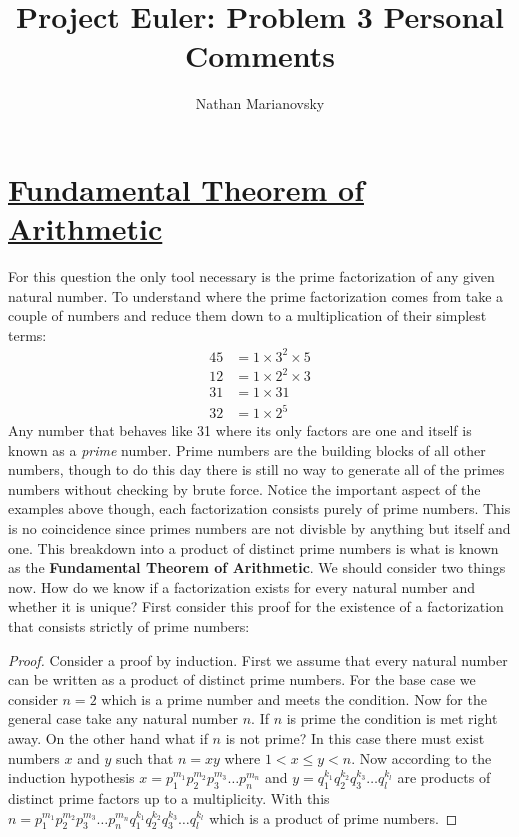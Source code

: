 \documentclass[12pt, letterpaper, onecolumn, conference, final]{IEEEtran}
\title{Project Euler: Problem 3 Personal Comments}
\author{Nathan Marianovsky}
\theoremstyle{definition}
\theoremstyle{plain}
\begin{document}
\maketitle

\section*{\underline{\Large{Fundamental Theorem of Arithmetic}}}
\vspace{.3cm}
\noindent
For this question the only tool necessary is the prime factorization of any given natural number. To understand where the prime factorization comes from take a couple of numbers and reduce them down to a multiplication of their simplest terms:
\begin{equation*}
\begin{split}
45 &= 1 \times 3^2 \times 5 \\
12 &= 1 \times 2^2 \times 3 \\
31 &= 1 \times 31 \\
32 &= 1 \times 2^5
\end{split}
\end{equation*}
Any number that behaves like 31 where its only factors are one and itself is known as a \textit{prime} number. Prime numbers are the building blocks of all other numbers, though to do this day there is still no way to generate all of the primes numbers without checking by brute force. Notice the important aspect of the examples above though, each factorization consists purely of prime numbers. This is no coincidence since primes numbers are not divisble by anything but itself and one. This breakdown into a product of distinct prime numbers is what is known as the \textbf{Fundamental Theorem of Arithmetic}. We should consider two things now. How do we know if a factorization exists for every natural number and whether it is unique? First consider this proof for the existence of a factorization that consists strictly of prime numbers:
\begin{proof}
Consider a proof by induction. First we assume that every natural number can be written as a product of distinct prime numbers. For the base case we consider $n=2$ which is a prime number and meets the condition. Now for the general case take any natural number $n$. If $n$ is prime the condition is met right away. On the other hand what if $n$ is not prime? In this case there must exist numbers $x$ and $y$ such that $n = xy$ where $1 < x \leq y < n$. Now according to the induction hypothesis $x = p_1^{m_1} p_2^{m_2} p_3^{m_3} \dots p_n^{m_n}$ and $y = q_1^{k_1} q_2^{k_2} q_3^{k_3} \dots q_l^{k_l}$ are products of distinct prime factors up to a multiplicity. With this $n = p_1^{m_1} p_2^{m_2} p_3^{m_3} \dots p_n^{m_n} q_1^{k_1} q_2^{k_2} q_3^{k_3} \dots q_l^{k_l}$ which is a product of prime numbers.
\end{proof}
\end{document}
